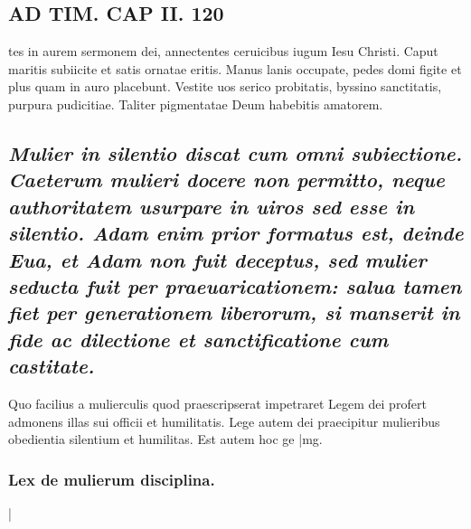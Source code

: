 \documentclass{article}
\begin{document}
\begin{pages}
\section*{AD TIM. CAP II. 120 }\pstart tes in aurem sermonem dei, annectentes ceruicibus iugum Iesu Christi. Caput maritis subiicite et satis ornatae eritis. Manus lanis occupate, pedes domi figite et plus quam in auro placebunt. Vestite uos serico probitatis, byssino sanctitatis, purpura pudicitiae. Taliter pigmentatae Deum habebitis amatorem.  \pend
{}
{}
\subsection*{\textit{Mulier in silentio discat cum omni subiectione. Caeterum mulieri docere non permitto, neque authoritatem usurpare in uiros sed esse in silentio. Adam enim prior formatus est, deinde Eua, et Adam non fuit deceptus, sed mulier seducta fuit per praeuaricationem: salua tamen fiet per generationem liberorum, si manserit in fide ac dilectione et sanctificatione cum castitate. }}\pstart Quo facilius a mulierculis quod praescripserat impetraret Legem dei profert admonens illas sui officii et humilitatis. Lege autem dei praecipitur mulieribus obedientia silentium et humilitas. Est autem hoc ge\pend
|mg. \subsubsection*{Lex de mulierum disciplina. }|

\end{pages}
\end{document}
